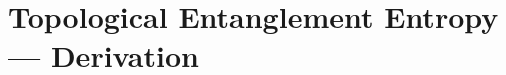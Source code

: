 \documentclass[11pt]{report}
\title{}
\author{}
\date{}
\begin{document}
\appendix
\setcounter{chapter}{4}
\chapter{Topological Entanglement Entropy --- Derivation}



\end{document}
